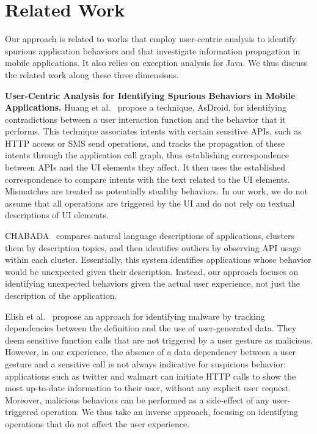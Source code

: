 \section{Related Work}
\label{sec:related}
Our approach is related to works that employ user-centric analysis to identify spurious application behaviors and that investigate information propagation in mobile applications. 
It also relies on  
exception analysis for  Java. 
We thus discuss the related work along these three dimensions. 

\vspace{0.1in}
\noindent 
{\bf User-Centric Analysis for Identifying Spurious Behaviors in Mobile Applications.}
Huang et al.~\cite{Huang:Zhang:Tan:Wang:Liang:ICSE14} propose a technique, AsDroid, for identifying contradictions between a user interaction function and the behavior that it performs. 
This technique associates intents with certain sensitive APIs, such as HTTP access or SMS send operations, and tracks the propagation
of these intents through the application call graph, thus establishing correspondence between APIs and the UI elements they affect. 
It then uses the established correspondence to compare intents with the text related to the UI elements. Mismatches are treated as potentially stealthy behaviors. 
In our work, we do not assume that all operations are triggered by the UI
and do not rely on textual descriptions of UI elements.

CHABADA~\cite{Gorla:Tavecchia:Gross:Zeller:ICSE14} compares natural language descriptions of applications, clusters them by description topics, and then identifies outliers by observing API usage within each cluster. Essentially, this system identifies applications whose behavior would be unexpected given their description. Instead, our approach focuses on identifying unexpected behaviors given the actual user experience, not just the description of the application.

Elish et al.~\cite{Elish:Yao:Ryder:MOST12} propose an approach for identifying malware by tracking dependencies between the definition and the use of user-generated data. They deem sensitive function calls that are not triggered by a user gesture as malicious. However, in our experience, the absence of a data dependency between a user gesture and a sensitive call is not always indicative for suspicious behavior: applications such as twitter and walmart can initiate HTTP calls to show the most up-to-date information to their user, without any explicit user request. Moreover, malicious behaviors can be performed as a side-effect of any user-triggered operation. We thus take an inverse approach, focusing on identifying operations that do not affect the user experience.

